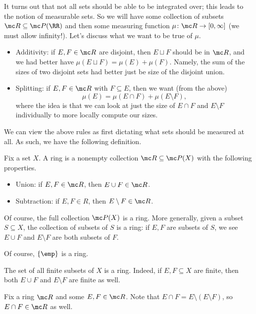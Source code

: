 \documentclass[../notes.tex]{subfiles}
\begin{document}
It turns out that not all sets should be able to be integrated over; this leads to the notion of measurable sets. So we will have some collection of subsets $\mc R\subseteq\mc P(\RR)$ and then some measuring function $\mu\colon\mc R\to[0,\infty]$ (we must allow infinity!). Let's discuss what we want to be true of $\mu$.
\begin{itemize}
	\item Additivity: if $E,F\in\mc R$ are disjoint, then $E\sqcup F$ should be in $\mc R$, and we had better have $\mu(E\sqcup F)=\mu(E)+\mu(F)$. Namely, the sum of the sizes of two disjoint sets had better just be size of the disjoint union.
	\item Splitting: if $E,F\in\mc R$ with $F\subseteq E$, then we want (from the above)
	\[\mu(E)=\mu(E\cap F)+\mu(E\setminus F),\]
	where the idea is that we can look at just the size of $E\cap F$ and $E\setminus F$ individually to more locally compute our sizes.
\end{itemize}
We can view the above rules as first dictating what sets should be measured at all. As such, we have the following definition.
\begin{definition}[Ring]
	Fix a set $X$. A ring is a nonempty collection $\mc R\subseteq\mc P(X)$ with the following properties.
	\begin{itemize}
		\item Union: if $E,F\in\mc R$, then $E\cup F\in\mc R$.
		\item Subtraction: if $E,F\in R$, then $E\setminus F\in\mc R$.
	\end{itemize}
\end{definition}
\begin{example}
	Of course, the full collection $\mc P(X)$ is a ring. More generally, given a subset $S\subseteq X$, the collection of subsets of $S$ is a ring: if $E,F$ are subsets of $S$, we see $E\cup F$ and $E\setminus F$ are both subsets of $F$.
\end{example}
\begin{example}
	Of course, $\{\emp\}$ is a ring.
\end{example}
\begin{example}
	The set of all finite subsets of $X$ is a ring. Indeed, if $E,F\subseteq X$ are finite, then both $E\cup F$ and $E\setminus F$ are finite as well.
\end{example}
\begin{remark}
	Fix a ring $\mc R$ and some $E,F\in\mc R$. Note that $E\cap F=E\setminus(E\setminus F)$, so $E\cap F\in\mc R$ as well.
\end{remark}
\end{document}
